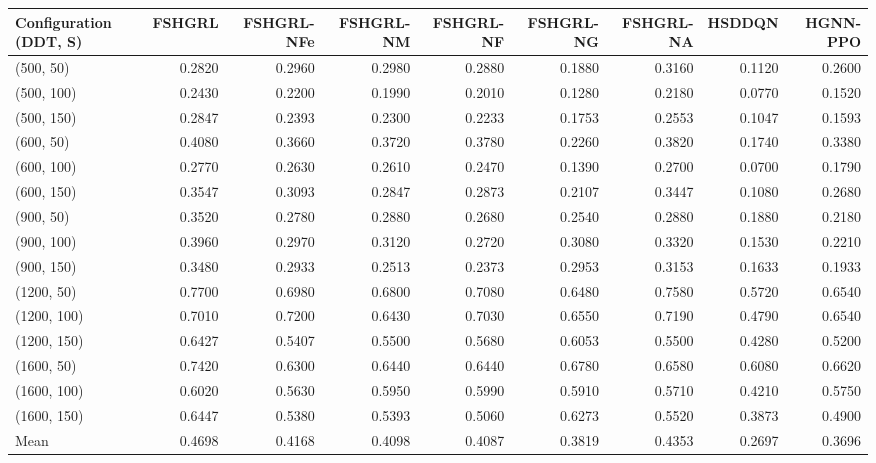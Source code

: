 \begin{tabular}{lrrrrrrrr}
\toprule
Configuration (DDT, S) & FSHGRL & FSHGRL-NFe & FSHGRL-NM & FSHGRL-NF & FSHGRL-NG & FSHGRL-NA & HSDDQN & HGNN-PPO \\
\midrule
(500, 50) & 0.2820 & 0.2960 & 0.2980 & 0.2880 & 0.1880 & 0.3160 & 0.1120 & 0.2600 \\
(500, 100) & 0.2430 & 0.2200 & 0.1990 & 0.2010 & 0.1280 & 0.2180 & 0.0770 & 0.1520 \\
(500, 150) & 0.2847 & 0.2393 & 0.2300 & 0.2233 & 0.1753 & 0.2553 & 0.1047 & 0.1593 \\
(600, 50) & 0.4080 & 0.3660 & 0.3720 & 0.3780 & 0.2260 & 0.3820 & 0.1740 & 0.3380 \\
(600, 100) & 0.2770 & 0.2630 & 0.2610 & 0.2470 & 0.1390 & 0.2700 & 0.0700 & 0.1790 \\
(600, 150) & 0.3547 & 0.3093 & 0.2847 & 0.2873 & 0.2107 & 0.3447 & 0.1080 & 0.2680 \\
(900, 50) & 0.3520 & 0.2780 & 0.2880 & 0.2680 & 0.2540 & 0.2880 & 0.1880 & 0.2180 \\
(900, 100) & 0.3960 & 0.2970 & 0.3120 & 0.2720 & 0.3080 & 0.3320 & 0.1530 & 0.2210 \\
(900, 150) & 0.3480 & 0.2933 & 0.2513 & 0.2373 & 0.2953 & 0.3153 & 0.1633 & 0.1933 \\
(1200, 50) & 0.7700 & 0.6980 & 0.6800 & 0.7080 & 0.6480 & 0.7580 & 0.5720 & 0.6540 \\
(1200, 100) & 0.7010 & 0.7200 & 0.6430 & 0.7030 & 0.6550 & 0.7190 & 0.4790 & 0.6540 \\
(1200, 150) & 0.6427 & 0.5407 & 0.5500 & 0.5680 & 0.6053 & 0.5500 & 0.4280 & 0.5200 \\
(1600, 50) & 0.7420 & 0.6300 & 0.6440 & 0.6440 & 0.6780 & 0.6580 & 0.6080 & 0.6620 \\
(1600, 100) & 0.6020 & 0.5630 & 0.5950 & 0.5990 & 0.5910 & 0.5710 & 0.4210 & 0.5750 \\
(1600, 150) & 0.6447 & 0.5380 & 0.5393 & 0.5060 & 0.6273 & 0.5520 & 0.3873 & 0.4900 \\
Mean & 0.4698 & 0.4168 & 0.4098 & 0.4087 & 0.3819 & 0.4353 & 0.2697 & 0.3696 \\
\bottomrule
\end{tabular}
